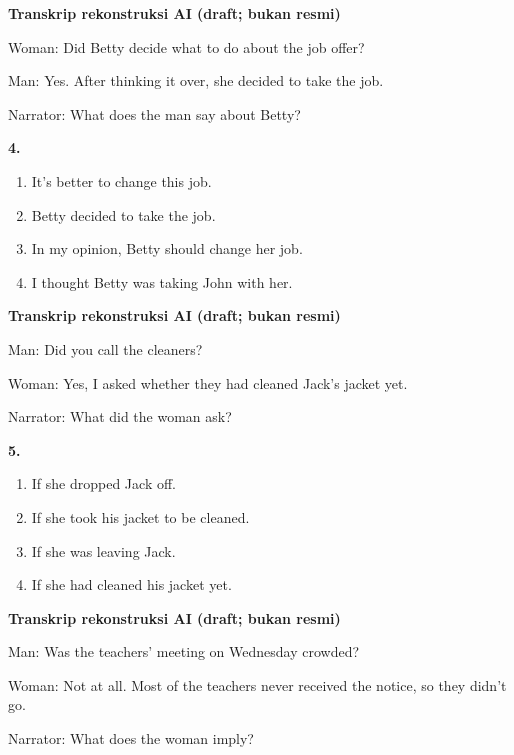 \documentclass[12pt]{article}
\begin{document}
\par
\vspace{0.25\baselineskip}
\begin{exampleblock}
\textbf{Transkrip rekonstruksi AI (draft; bukan resmi)}\par
Woman: Did Betty decide what to do about the job offer?\par
Man: Yes. After thinking it over, she decided to take the job.\par
Narrator: What does the man say about Betty?\par
\end{exampleblock}
\noindent\textbf{4.}
\begin{enumerate}[label=(\Alph*),leftmargin=*,itemsep=0.2em]
\item It's better to change this job.
\item Betty decided to take the job.
\item In my opinion, Betty should change her job.
\item I thought Betty was taking John with her.
\end{enumerate}
\par
\vspace{0.25\baselineskip}
\begin{exampleblock}
\textbf{Transkrip rekonstruksi AI (draft; bukan resmi)}\par
Man: Did you call the cleaners?\par
Woman: Yes, I asked whether they had cleaned Jack's jacket yet.\par
Narrator: What did the woman ask?\par
\end{exampleblock}
\noindent\textbf{5.}
\begin{enumerate}[label=(\Alph*),leftmargin=*,itemsep=0.2em]
\item If she dropped Jack off.
\item If she took his jacket to be cleaned.
\item If she was leaving Jack.
\item If she had cleaned his jacket yet.
\end{enumerate}
\par
\vspace{0.25\baselineskip}
\begin{exampleblock}
\textbf{Transkrip rekonstruksi AI (draft; bukan resmi)}\par
Man: Was the teachers' meeting on Wednesday crowded?\par
Woman: Not at all. Most of the teachers never received the notice, so they didn't go.\par
Narrator: What does the woman imply?\par
\end{exampleblock}
\end{document}
